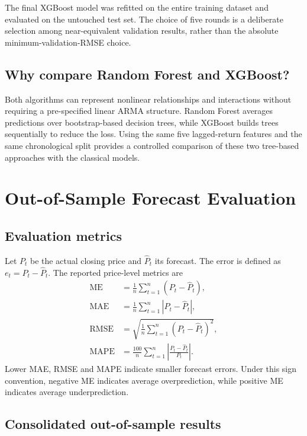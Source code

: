 \documentclass[10pt,a4paper]{article}
\newcommand{\MAE}{\operatorname{MAE}}
\newcommand{\RMSE}{\operatorname{RMSE}}
\newcommand{\MAPE}{\operatorname{MAPE}}
\newcommand{\ME}{\operatorname{ME}}
\begin{document}
The final XGBoost model was refitted on the entire training dataset and evaluated on the untouched test set. The choice of five rounds is a deliberate selection among near-equivalent validation results, rather than the absolute minimum-validation-RMSE choice.

\subsection{Why compare Random Forest and XGBoost?}

Both algorithms can represent nonlinear relationships and interactions without requiring a pre-specified linear ARMA structure. Random Forest averages predictions over bootstrap-based decision trees, while XGBoost builds trees sequentially to reduce the loss. Using the same five lagged-return features and the same chronological split provides a controlled comparison of these two tree-based approaches with the classical models.

\section{Out-of-Sample Forecast Evaluation}
\label{sec:overall_results}

\subsection{Evaluation metrics}

Let $P_t$ be the actual closing price and $\widehat P_t$ its forecast. The error is defined as $e_t=P_t-\widehat P_t$. The reported price-level metrics are
\begin{align}
  \ME &= \frac{1}{n}\sum_{t=1}^{n}(P_t-\widehat P_t),\\
  \MAE &= \frac{1}{n}\sum_{t=1}^{n}|P_t-\widehat P_t|,\\
  \RMSE &= \sqrt{\frac{1}{n}\sum_{t=1}^{n}(P_t-\widehat P_t)^2},\\
  \MAPE &= \frac{100}{n}\sum_{t=1}^{n}
  \left|\frac{P_t-\widehat P_t}{P_t}\right|.
\end{align}
Lower MAE, RMSE and MAPE indicate smaller forecast errors. Under this sign convention, negative ME indicates average overprediction, while positive ME indicates average underprediction.

\subsection{Consolidated out-of-sample results}
\end{document}
